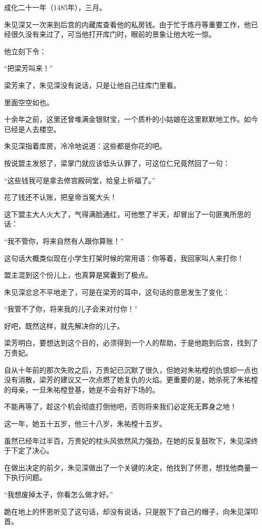 \begin{multicols}{\theparacolNo}
成化二十一年（1485年），三月。

朱见深又一次来到后宫的内藏库查看他的私房钱。由于忙于炼丹等重要工作，他已经很久没有来过了，可当他打开库门时，眼前的景象让他大吃一惊。

他立刻下令：

“把梁芳叫来！”

梁芳来了，朱见深没有说话，只是让他自己往库门里看。

里面空空如也。

十余年之前，这里还曾堆满金银财宝，一个质朴的小姑娘在这里默默地工作。如今已经是人去楼空。

朱见深指着库房，冷冷地说道：这些都是你花的吧。

按说盟主发怒了，梁掌门就应该低头认罪了，可这位仁兄竟然回了一句：

“这些钱我可是拿去修宫殿祠堂，给皇上祈福了。”

花了钱还不认账，把皇帝当冤大头！

这下盟主大人火大了，气得满脸通红，可他憋了半天，却冒出了一句匪夷所思的话：

“我不管你，将来自然有人跟你算账！”

这句话大概类似现在小学生打架时候的常用语：你等着，我回家叫人来打你！

盟主混到这个份儿上，也真算是窝囊到了极点。

朱见深忿忿不平地走了，可是在梁芳的耳中，这句话的意思发生了变化：

“我管不了你，将来我的儿子会来对付你！”

好吧，既然这样，就先解决你的儿子。

梁芳明白，要想达到这个目的，必须得到一个人的帮助，于是他跑到后宫，找到了万贵妃。

自从十年前的那次失败之后，万贵妃已沉默了很久，但她对朱祐樘的仇恨却一点也没有消散，梁芳的建议又一次点燃了她复仇的火焰。更重要的是，她杀死了朱祐樘的母亲，一旦朱祐樘登基，她是不会有好下场的。

不能再等了，趁这个机会彻底打倒他吧，否则将来我们必定死无葬身之地！

这一年，她五十五岁，他三十八岁，朱祐樘十五岁。

虽然已经年过半百，万贵妃的枕头风依然风力强劲，在她的反复鼓吹下，朱见深终于下定了决心。

在做出决定的前夕，朱见深做出了一个关键的决定，他找到了怀恩，想找他商量一下执行问题。

“我想废掉太子，你看怎么做才好。”

跪在地上的怀恩听见了这句话，却没有说话，只是脱下了自己的帽子，向朱见深叩首。


\end{multicols}
